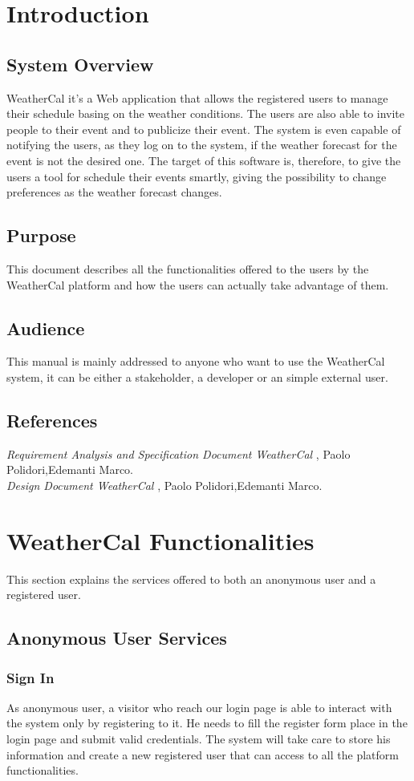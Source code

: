 \chapter{Introduction} \label{cap:cap1}
\section{System Overview}
WeatherCal  it's a Web application that allows the registered users to manage their schedule basing on the weather conditions. The users are also able to invite people to their event and to publicize their event. The system is even capable of notifying the users, as they log on to the system, if the weather forecast for the event is not the desired one. The target of this software is, therefore, to give the users a tool for schedule their events smartly, giving the possibility to change preferences as the weather forecast changes.
\section{Purpose}
This document describes all the functionalities offered to the users by the WeatherCal platform and how the users can actually take advantage of them.
\section{Audience}
This manual is mainly addressed to anyone who want to use the WeatherCal system, it can be either a stakeholder, a developer or an simple external user.
\section{References}
{\it Requirement Analysis and Specification Document WeatherCal },  Paolo Polidori,Edemanti Marco.\\
{\it Design Document WeatherCal },  Paolo Polidori,Edemanti Marco.

\chapter {WeatherCal Functionalities}
This section explains the services offered to both an anonymous user and a registered user. 
\section{Anonymous User Services}
\subsection{Sign In}
As anonymous user, a visitor who reach our login page is able to interact with the system only by registering to it. He needs to fill the register form place in the login page and submit valid credentials. The system will take care to store his information and create a new registered user that can access to all the platform functionalities.
